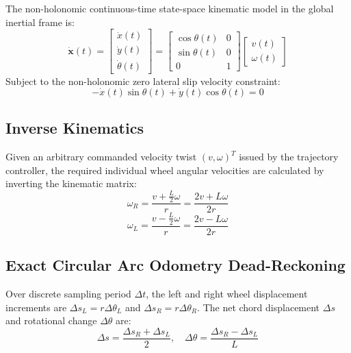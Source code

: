 \documentclass[10pt,a4paper]{article}
\begin{document}
The non-holonomic continuous-time state-space kinematic model in the global inertial frame is:
\begin{equation}
\dot{\mathbf{x}}(t) = \begin{bmatrix} \dot{x}(t) \\ \dot{y}(t) \\ \dot{\theta}(t) \end{bmatrix} = \begin{bmatrix} \cos\theta(t) & 0 \\ \sin\theta(t) & 0 \\ 0 & 1 \end{bmatrix} \begin{bmatrix} v(t) \\ \omega(t) \end{bmatrix}
\end{equation}
Subject to the non-holonomic zero lateral slip velocity constraint:
\begin{equation}
-\dot{x}(t)\sin\theta(t) + \dot{y}(t)\cos\theta(t) = 0
\end{equation}

\subsection{Inverse Kinematics}
Given an arbitrary commanded velocity twist $(v, \omega)^T$ issued by the trajectory controller, the required individual wheel angular velocities are calculated by inverting the kinematic matrix:
\begin{equation}
\omega_R = \frac{v + \frac{L}{2}\omega}{r} = \frac{2v + L\omega}{2r}
\end{equation}
\begin{equation}
\omega_L = \frac{v - \frac{L}{2}\omega}{r} = \frac{2v - L\omega}{2r}
\end{equation}

\subsection{Exact Circular Arc Odometry Dead-Reckoning}
Over discrete sampling period $\Delta t$, the left and right wheel displacement increments are $\Delta s_L = r \Delta \theta_L$ and $\Delta s_R = r \Delta \theta_R$. The net chord displacement $\Delta s$ and rotational change $\Delta \theta$ are:
\begin{equation}
\Delta s = \frac{\Delta s_R + \Delta s_L}{2}, \quad \Delta \theta = \frac{\Delta s_R - \Delta s_L}{L}
\end{equation}
\end{document}
